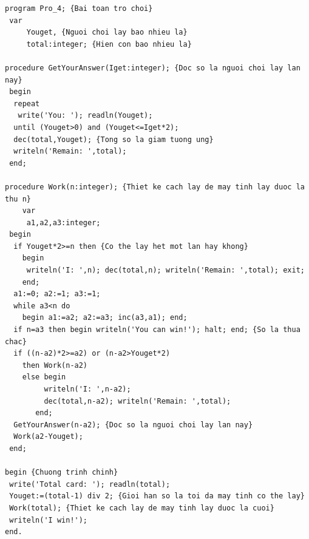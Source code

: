 \documentclass[11pt]{article}
\begin{document}
\begin{verbatim}
program Pro_4; {Bai toan tro choi}
 var
     Youget, {Nguoi choi lay bao nhieu la}
     total:integer; {Hien con bao nhieu la}

procedure GetYourAnswer(Iget:integer); {Doc so la nguoi choi lay lan nay}
 begin
  repeat
   write('You: '); readln(Youget);
  until (Youget>0) and (Youget<=Iget*2);
  dec(total,Youget); {Tong so la giam tuong ung}
  writeln('Remain: ',total);
 end;

procedure Work(n:integer); {Thiet ke cach lay de may tinh lay duoc la thu n}
    var
     a1,a2,a3:integer;
 begin
  if Youget*2>=n then {Co the lay het mot lan hay khong}
    begin
     writeln('I: ',n); dec(total,n); writeln('Remain: ',total); exit;
    end;
  a1:=0; a2:=1; a3:=1;
  while a3<n do
    begin a1:=a2; a2:=a3; inc(a3,a1); end;
  if n=a3 then begin writeln('You can win!'); halt; end; {So la thua chac}
  if ((n-a2)*2>=a2) or (n-a2>Youget*2)
    then Work(n-a2)
    else begin
         writeln('I: ',n-a2);
         dec(total,n-a2); writeln('Remain: ',total);
       end;
  GetYourAnswer(n-a2); {Doc so la nguoi choi lay lan nay}
  Work(a2-Youget);
 end;

begin {Chuong trinh chinh}
 write('Total card: '); readln(total);
 Youget:=(total-1) div 2; {Gioi han so la toi da may tinh co the lay}
 Work(total); {Thiet ke cach lay de may tinh lay duoc la cuoi}
 writeln('I win!');
end.
\end{verbatim}
\end{document}
